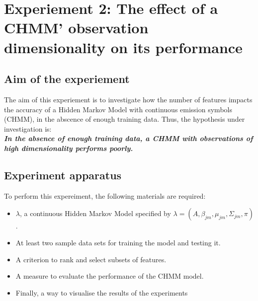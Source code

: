 \section{Experiement 2: The effect of a CHMM' observation dimensionality on its performance} \label{exp:feat-size}

\subsection{Aim of the experiement}
The aim of this experiement is to investigate how the number of features impacts the accuracy of a Hidden Markov Model with continuous emission symbols (CHMM), in the abscence of enough training data. Thus, the hypothesis under investigation is:\\
\textbf{\textit{In the absence of enough training data, a CHMM with observations of high dimensionality performs poorly.}}

\subsection{Experiment apparatus}
To perform this expereiment, the following materials are required:
\begin{itemize}
	\item \(\lambda\), a continuous Hidden Markov Model specified by \(\lambda = (A, \beta_{jm}, \mu_{jm}, \Sigma_{jm}, \pi)\).
	\item At least two sample data sets for training the model and testing it.
	\item A criterion to rank and select subsets of features.
	\item A measure to evaluate the performance of the CHMM model.
	\item Finally, a way to visualise the results of the experiments
\end{itemize}

